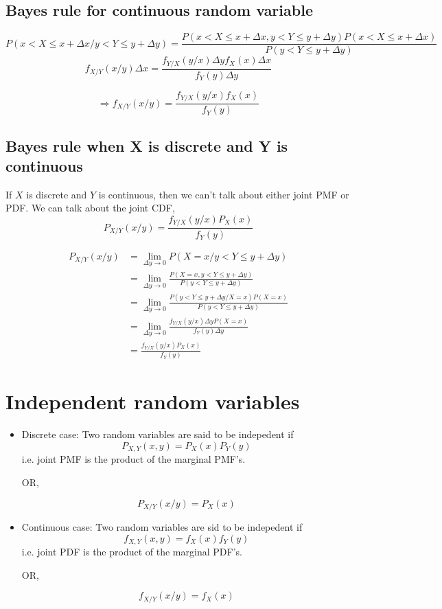 \documentclass{article}
\begin{document}
\subsection{Bayes rule for continuous random variable}
$$ P(x < X \leq x+ \Delta x / y<Y \leq y+ \Delta y)= \frac{P(x < X \leq x+ \Delta x , y<Y \leq y+ \Delta y)P(x < X \leq x+ \Delta x)}{P(y<Y \leq y+ \Delta y)}$$
$$ f_{X/Y}(x/y) \Delta x =\frac{f_{Y/X} (y/x) \Delta y f_X (x) \Delta x}{f_Y (y) \Delta y} $$

$$ \Rightarrow f_{X/Y}(x/y)  =\frac{f_{Y/X} (y/x)  f_X (x) }{f_Y (y)}$$



\subsection{Bayes rule when X is discrete and Y is continuous}
If $X$ is discrete and $Y$ is continuous, then we can't talk about either joint PMF or PDF. We can talk about the joint CDF,
$$ P_{X/Y} (x/y) = \frac{f_{Y/X} (y/x) P_X (x)}{f_Y(y)}$$

\begin{align*}
    P_{X/Y}(x/y) &= \lim_{\Delta y \to 0} P(X=x/y<Y \leq y + \Delta y) \\
    &= \lim_{\Delta y \to 0} \frac{P(X=x,y<Y \leq y + \Delta y)}{P(y<Y \leq y + \Delta y)} \\
    &= \lim_{\Delta y \to 0} \frac{P(y< Y \leq y + \Delta y / X= x)P(X=x)}{P(y<Y \leq y+ \Delta y)} \\
    &= \lim_{\Delta y \to 0}\frac{f_{Y/X} (y/x) \Delta y P(X=x)}{f_Y(y) \Delta y} \\
    &=\frac{f_{Y/X} (y/x) P_X (x)}{f_Y(y)}
\end{align*}

\section{Independent random variables}

\begin{itemize}
    \item Discrete case: Two random variables are said to be indepedent if
    $$ P_{X,Y}(x,y)= P_X (x) P_Y(y)$$
    i.e. joint PMF is the product of the marginal PMF's.

    OR,

    $$ P_{X/Y}(x/y) = P_X (x)$$
    \item Continuous case: Two random variables are sid to be indepedent if
    $$ f_{X,Y}(x,y)= f_X (x) f_Y (y)$$
    i.e. joint PDF is the product of the marginal PDF's.

    OR,

    $$ f_{X/Y}(x/y) = f_X (x)$$
\end{itemize}
\end{document}
